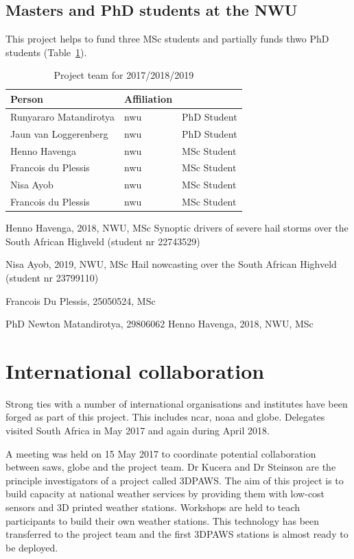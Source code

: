 \documentclass{wrcreport}
\begin{document}
\subsection{Masters and PhD students at the NWU}

This project helps to fund three MSc students and partially funds thwo  PhD students (Table~\ref{table:students}).

\begin{table}[!htbp]
\caption{Project team for 2017/2018/2019}
\label{table:students}
\begin{center}
\begin{tabular}{ l l l } 
\toprule
\bfseries Person & \bfseries Affiliation \\
\midrule
Runyararo Matandirotya & \gls{nwu} & PhD Student \\
Jaun van Loggerenberg & \gls{nwu} & PhD Student \\
Henno Havenga & \gls{nwu} & MSc Student \\
Francois du Plessis & \gls{nwu} & MSc Student \\
Nisa Ayob & \gls{nwu} & MSc Student \\
Francois du Plessis & \gls{nwu} & MSc Student \\
\bottomrule 
\end{tabular}
\end{center}
\end{table}

Henno Havenga, 2018, NWU, MSc
Synoptic drivers of severe hail storms over the South African Highveld
(student nr 22743529)

Nisa Ayob, 2019, NWU, MSc
Hail nowcasting over the South African Highveld
(student nr 23799110)



Francois Du Plessis, 25050524, MSc

PhD
Newton Matandirotya, 29806062
Henno Havenga, 2018, NWU, MSc


\section{International collaboration}

Strong ties with a number of international organisations and institutes have been forged as part of this project. This includes \gls{ncar}, \gls{noaa} and \gls{globe}. Delegates visited South Africa in May 2017 and again during April 2018.

A meeting was held on 15 May 2017 to coordinate potential collaboration between \gls{saws}, \gls{globe} and the project team. Dr Kucera and Dr Steinson are the principle investigators of a project called 3DPAWS. The aim of this project is to build capacity at national weather services by providing them with low-cost sensors and 3D printed weather stations. Workshops are held to teach participants to build their own weather stations. This technology has been transferred to the project team and the first 3DPAWS stations is almost ready to be deployed.   
\end{document}
